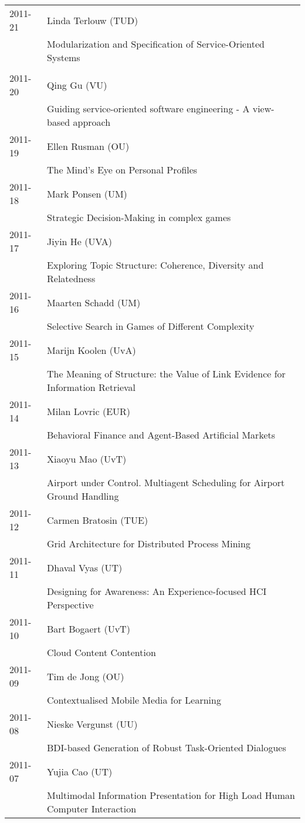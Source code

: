 \begin{longtable}{p{1.25cm}p{10.75cm}}
2011-21 & Linda Terlouw (TUD) \\& Modularization and Specification of Service-Oriented Systems \\
\\
2011-20 & Qing Gu (VU) \\& Guiding service-oriented software engineering - A view-based approach \\
2011-19 & Ellen Rusman (OU) \\& The Mind's Eye on Personal Profiles \\
2011-18 & Mark Ponsen (UM) \\& Strategic Decision-Making in complex games \\
2011-17 & Jiyin He (UVA) \\& Exploring Topic Structure: Coherence, Diversity and Relatedness \\
2011-16 & Maarten Schadd (UM) \\& Selective Search in Games of Different Complexity \\
2011-15 & Marijn Koolen (UvA) \\& The Meaning of Structure: the Value of Link Evidence for Information \newline Retrieval \\
2011-14 & Milan Lovric (EUR) \\& Behavioral Finance and Agent-Based Artificial Markets \\
2011-13 & Xiaoyu Mao (UvT) \\& Airport under Control. Multiagent Scheduling for Airport Ground Handling \\
2011-12 & Carmen Bratosin (TUE) \\& Grid Architecture for Distributed Process Mining \\
2011-11 & Dhaval Vyas (UT) \\& Designing for Awareness: An Experience-focused HCI Perspective \\
2011-10 & Bart Bogaert (UvT) \\& Cloud Content Contention \\
2011-09 & Tim de Jong (OU) \\& Contextualised Mobile Media for Learning \\
2011-08 & Nieske Vergunst (UU) \\& BDI-based Generation of Robust Task-Oriented Dialogues \\
2011-07 & Yujia Cao (UT) \\& Multimodal Information Presentation for High Load Human Computer \newline Interaction \\

\end{longtable}
